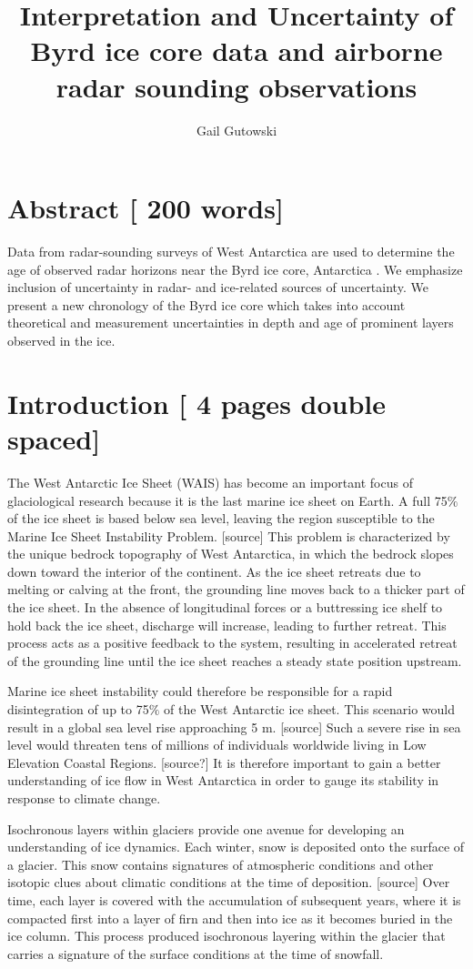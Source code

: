 \documentclass[draft,jgrga]{agutex}
\begin{document}
\title{Interpretation and Uncertainty of Byrd ice core data and
airborne radar sounding observations} \author{Gail Gutowski}

\section{Abstract [ 200 words]}
Data from radar-sounding surveys of West Antarctica are used to
determine the age of observed radar horizons near the Byrd ice core,
Antarctica \citep{Gow68}. We emphasize inclusion of uncertainty in
radar- and ice-related sources of uncertainty. We present a new
chronology of the Byrd ice core which takes into account theoretical
and measurement uncertainties in depth and age of prominent layers
observed in the ice.


\section{Introduction [ 4 pages double spaced]}
The West Antarctic Ice Sheet (WAIS) has become an important focus of
	glaciological research because it is the last marine ice sheet
	on Earth. A full 75$\%$ of the ice sheet is based below sea
	level, leaving the region susceptible to the Marine Ice Sheet
	Instability Problem. [source] This problem is characterized by
	the unique bedrock topography of West Antarctica, in which the
	bedrock slopes down toward the interior of the continent. As
	the ice sheet retreats due to melting or calving at the front,
	the grounding line moves back to a thicker part of the ice
	sheet. In the absence of longitudinal forces or a buttressing
	ice shelf to hold back the ice sheet, discharge will increase,
	leading to further retreat. This process acts as a positive
	feedback to the system, resulting in accelerated retreat of
	the grounding line until the ice sheet reaches a steady state
	position upstream.

Marine ice sheet instability could
	therefore be responsible for a rapid disintegration of up to
	75$\%$ of the West Antarctic ice sheet. This scenario would
	result in a global sea level rise approaching 5 m. [source]
	Such a severe rise in sea level would threaten tens of
	millions of individuals worldwide living in Low Elevation
	Coastal Regions. [source?] It is therefore important to gain a
	better understanding of ice flow in West Antarctica in order
	to gauge its stability in response to climate change.

	Isochronous layers within glaciers provide one avenue for
	developing an understanding of ice dynamics.  Each winter,
	snow is deposited onto the surface of a glacier. This snow
	contains signatures of atmospheric conditions and other
	isotopic clues about climatic conditions at the time of
	deposition. [source] Over time, each layer is covered with the
	accumulation of subsequent years, where it is compacted first
	into a layer of firn and then into ice as it becomes buried in
	the ice column. This process produced isochronous layering
	within the glacier that carries a signature of the surface
	conditions at the time of snowfall.   
\end{document}
